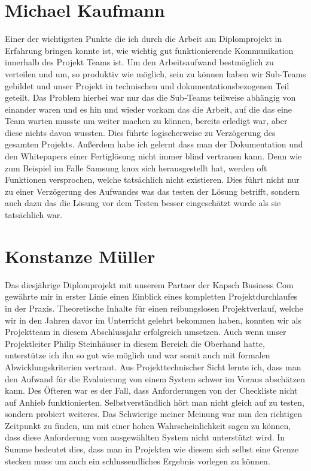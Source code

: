 \section{Michael Kaufmann}
Einer der wichtigsten Punkte die ich durch die Arbeit am Diplomprojekt in Erfahrung bringen konnte ist, wie wichtig gut funktionierende Kommunikation innerhalb des Projekt Teams ist. Um den Arbeitsaufwand bestmöglich zu verteilen und um, so produktiv wie möglich, sein zu können haben wir Sub-Teams gebildet und unser Projekt in technischen und dokumentationsbezogenen Teil geteilt.
Das Problem hierbei war nur das die Sub-Teams teilweise abhängig von einander waren und es hin und wieder vorkam das die Arbeit, auf die das eine Team warten musste um weiter machen zu können, bereits erledigt war, aber diese nichts davon wussten. Dies führte logischerweise zu Verzögerung des gesamten Projekts. 
Außerdem habe ich gelernt dass man der Dokumentation und den Whitepapers einer Fertiglösung nicht immer blind vertrauen kann. Denn wie zum Beispiel im Falle Samsung knox sich herausgestellt hat, werden oft Funktionen versprochen, welche tatsächlich nicht existieren. Dies führt nicht nur zu einer Verzögerung des Aufwandes was das testen der Lösung betrifft, sondern auch dazu das die Lösung vor dem Testen besser eingeschätzt wurde als sie tatsächlich war.

\section{Konstanze Müller}
Das diesjährige Diplomprojekt mit unserem Partner der Kapsch Business Com gewährte mir in erster Linie einen Einblick eines kompletten Projektdurchlaufes in der Praxis. Theoretische Inhalte für einen reibungslosen Projektverlauf, welche wir in den Jahren davor im Unterricht gelehrt bekommen haben, konnten wir als Projektteam in diesem Abschlussjahr erfolgreich umsetzen. Auch wenn unser Projektleiter Philip Steinhäuser in diesem Bereich die Oberhand hatte, unterstütze ich ihn so gut wie möglich und war somit auch mit formalen Abwicklungskriterien vertraut. 
Aus Projekttechnischer Sicht lernte ich, dass man den Aufwand für die Evaluierung von einem System schwer im Voraus abschätzen kann. Des Öfteren war es der Fall, dass Anforderungen von der Checkliste nicht auf Anhieb funktionierten. Selbstverständlich hört man nicht gleich auf zu testen, sondern probiert weiteres. Das Schwierige meiner Meinung war nun den richtigen Zeitpunkt zu finden, um mit einer hohen Wahrscheinlichkeit sagen zu können, dass diese Anforderung vom ausgewählten System nicht unterstützt wird. In Summe bedeutet dies, dass man in Projekten wie diesem sich selbst eine Grenze stecken muss um auch ein schlussendliches Ergebnis vorlegen zu können. 

